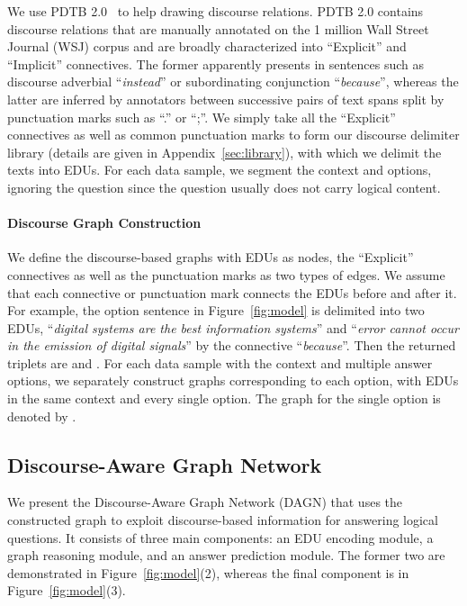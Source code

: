 \documentclass[11pt]{article}
\newcommand{\moe}[1]{{\color{black} #1}}
\begin{document}
\moe{We use PDTB 2.0~\cite{prasad2008penn} to help drawing discourse relations.}
PDTB 2.0 contains discourse relations that are manually annotated on the 1 million Wall Street Journal (WSJ) corpus and are broadly characterized into ``Explicit'' and ``Implicit'' connectives.
The former apparently presents in sentences such as discourse adverbial ``\textit{instead}'' or subordinating conjunction ``\textit{because}'',
whereas the latter are inferred by annotators between successive pairs of text spans split by punctuation marks such as ``.'' or ``;''.
We simply take all the ``Explicit'' connectives as well as common punctuation marks to form our discourse delimiter library (details are given in Appendix~\ref{sec:library}), with which we delimit the texts into EDUs.
For each data sample, we segment the context and options, ignoring the question since the question usually does not carry logical content.

\paragraph{Discourse Graph Construction} 
We define the discourse-based graphs with EDUs as nodes, the ``Explicit'' connectives as well as the punctuation marks as two types of edges.
We assume that each connective or punctuation mark connects the EDUs before and after it.
For example, the option sentence in Figure~\ref{fig:model}
is delimited into two EDUs, ``\textit{digital systems are the best information systems}'' and ``\textit{error cannot occur in the emission of digital signals}'' by the connective ``\textit{because}''. Then the returned triplets are  and .
For each data sample with the context and multiple answer options, we separately construct graphs corresponding to each option, with EDUs in the same context and every single option. The graph for the single option  is denoted by .

\subsection{Discourse-Aware Graph Network}
We present the Discourse-Aware Graph Network (DAGN) that uses the constructed graph to exploit discourse-based information for answering logical questions.
\moe{
It consists of three main components: an EDU encoding module, a graph reasoning module, and an answer prediction module.}
The former two are demonstrated in Figure~\ref{fig:model}(2), whereas the final component is in Figure~\ref{fig:model}(3).
\end{document}
